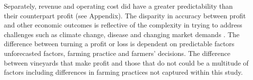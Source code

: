 \documentclass[review,12pt,authoryear]{elsarticle}
\begin{document}
\begin{linenumbers}


Separately, revenue and operating cost did have a greater predictability than their counterpart profit (see Appendix). The disparity in accuracy between profit and other economic outcomes is reflective of the complexity in trying to address challenges such as climate change, disease and changing market demands \citep{wineaustraliaNationalVintageReport2020,wineaustraliaNationalVintageReport2021,wineaustraliaNationalVintageReport2022}. The difference between turning a profit or loss is dependent on predictable factors unforecasted factors, farming practice and farmers' decisions. The difference between vineyards that make profit and those that do not could be a multitude of factors including differences in farming practices not captured within this study.
\iffalse




\end{linenumbers}
\end{document}
